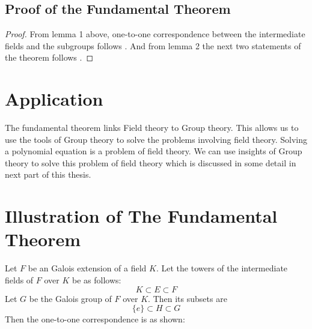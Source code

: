 \subsection{Proof of the Fundamental Theorem}
\begin{proof}
From lemma 1 above, one-to-one correspondence between the intermediate fields and the subgroups follows \cite{hunger}. And from lemma 2 the next two statements of the theorem follows \cite{hunger}.
\end{proof}
\vspace{3mm}

\section{Application}
The fundamental theorem links Field theory to Group theory. This allows us to use the tools of Group theory to solve the problems involving field theory. Solving a polynomial equation is a problem of field theory. We can use insights of Group theory to solve this problem of field theory which is discussed in some detail in next part of this thesis.
\clearpage

\section{Illustration of The Fundamental Theorem}
\begin{minipage}{0.68\textwidth}
  Let \(F\) be an Galois extension of a field \(K\). Let the towers of the intermediate fields of \(F\) over \(K\) be as follows:
  \[
    K \subset E \subset F
  \]
\noindent
  Let \(G\) be the Galois group of \(F\) over \(K\). Then its subsets are
  \[
    \{e\} \subset H \subset G
  \]
  Then the one-to-one correspondence is as shown:
\end{minipage}\hspace{2mm}
\begin{minipage}{0.3\textwidth}

  \begin{tcolorbox}[colback=gray!20, colframe=blue!20, title={\footnotesize \textcolor{black}{Galois-correspondence}}, width=5cm]
  \end{tcolorbox}
\end{minipage}

